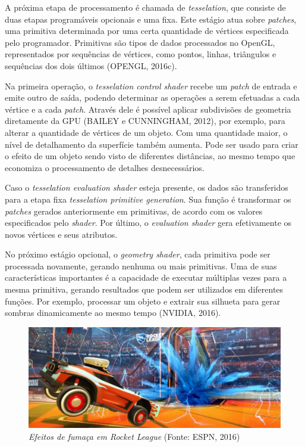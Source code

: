 A próxima etapa de processamento é chamada de \textit{tesselation}, que consiste de duas etapas programáveis opcionais e uma fixa. Este estágio atua sobre \textit{patches}, uma primitiva determinada por uma certa quantidade de vértices especificada pelo programador. Primitivas são tipos de dados processados no OpenGL, representados por sequências de vértices, como pontos, linhas, triângulos e sequências dos dois últimos (OPENGL, 2016c).

Na primeira operação, o \textit{tesselation control shader} recebe um \textit{patch} de entrada e emite outro de saída, podendo determinar as operações a serem efetuadas a cada vértice e a cada \textit{patch}. Através dele é possível aplicar subdivisões de geometria diretamente da GPU (BAILEY e CUNNINGHAM, 2012), por exemplo, para alterar a quantidade de vértices de um objeto. Com uma quantidade maior, o nível de detalhamento da superfície também aumenta. Pode ser usado para criar o efeito de um objeto sendo visto de diferentes distâncias, ao mesmo tempo que economiza o processamento de detalhes desnecessários. 

Caso o \textit{tesselation evaluation shader} esteja presente, os dados são transferidos para a etapa fixa \textit{tesselation primitive generation}. Sua função é transformar os \textit{patches} gerados anteriormente em primitivas, de acordo com os valores especificados pelo \textit{shader}. Por último, o \textit{evaluation shader} gera efetivamente os novos vértices e seus atributos.

No próximo estágio opcional, o \textit{geometry shader}, cada primitiva pode ser processada novamente, gerando nenhuma ou mais primitivas. Uma de suas características importantes é a capacidade de executar múltiplas vezes para a mesma primitiva, gerando resultados que podem ser utilizados em diferentes funções. Por exemplo, processar um objeto e extrair sua silhueta para gerar sombras dinamicamente ao mesmo tempo (NVIDIA, 2016).

\begin{figure}[H]
	\centering
	\includegraphics[scale=0.3]{imagens/rocketleague.jpg}
	\caption{\small \textit{Efeitos de fumaça em Rocket League} (Fonte: ESPN, 2016)}
	\label{fig:rocketleague}
\end{figure}

